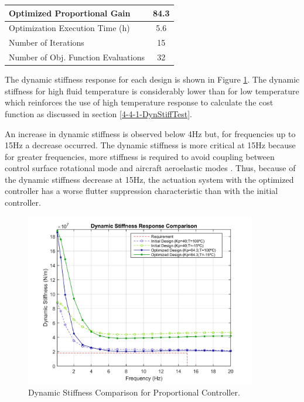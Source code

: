 \begin{table}[H]
	\label{table:5_1_1_PContExecution}
	\centering
	\resizebox{7cm}{!} {
	\begin{tabular}{|l|c|}
		\hline
		Optimized Proportional Gain & 84.3 \\ \hline
		Optimization Execution Time (h) & 5.6 \\ \hline
		Number of Iterations & 15 \\ \hline		
		Number of Obj. Function Evaluations & 32 \\ \hline			
	\end{tabular}}
\end{table}

The  dynamic stiffness response for each design is shown in Figure \ref{fig:5_1_1_P_DynStif}. The dynamic stiffness for high fluid temperature is considerably lower than for low temperature which reinforces the use of high temperature response to calculate the cost function as discussed in section \ref{4-4-1-DynStiffTest}.

An increase in dynamic stiffness is observed below 4Hz but, for frequencies up to 15Hz a decrease occurred. The dynamic stiffness is more critical at 15Hz because for greater frequencies, more stiffness is required to avoid coupling between control surface rotational mode and aircraft aeroelastic modes \cite{Ballesteros}. Thus, because of the dynamic stiffness decrease at 15Hz, the actuation system with the optimized controller has a worse flutter suppression characteristic than with the initial controller. 

\begin{figure}[H]
	\centering
	\centerline{\includegraphics[width=0.9\textwidth]{Figuras/5.OptimizationResults/5-1-1-P-DynamicStiffnessComparison.jpg}}
	\caption{Dynamic Stiffness Comparison for Proportional Controller.}
	\label{fig:5_1_1_P_DynStif}
\end{figure}

